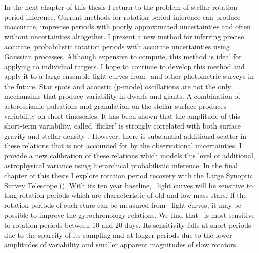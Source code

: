 In the next chapter of this thesis I return to the problem of stellar rotation
period inference.
Current methods for rotation period inference can produce inaccurate,
imprecise periods with poorly approximated uncertainties and often without
uncertainties altogether.
I present a new method for inferring precise, accurate, probabilistic rotation
periods with accurate uncertainties using Gaussian processes.
Although expensive to compute, this method is ideal for applying to individual
targets.
I hope to continue to develop this method and apply it to a large ensemble
light curves from \kepler\ and other photometric surveys in the future.
Star spots and acoustic (p-mode) oscillations are not the only mechansims
that produce variability in dwarfs and giants.
A combination of asteroseismic pulsations and granulation on the stellar
surface produces variability on short timescales.
It has been shown that the amplitude of this short-term variability, called
`flicker' is strongly correlated with both surface gravity and stellar
density \citep{Bastien2013, Bastien2016, Kipping2014}.
However, there is substantial additional scatter in these relations that is
not accounted for by the observational uncertainties.
I provide a new calibration of these relations which models this level of
additional, astrophysical variance using hierarchical probabilistic inference.
In the final chapter of this thesis I explore rotation period recovery with
the Large Synoptic Survey Telescope (\LSST).
With its ten year baseline, \LSST\ light curves will be sensitive to long
rotation periods which are characteristic of old and low-mass stars.
If the rotation periods of such stars can be measured from \LSST\ light
curves, it may be possible to improve the gyrochronology relations.
We find that \LSST\ is most sensitive to rotation periods between 10 and 20
days.
Its sensitivity falls at short periods due to the sparcity of its sampling and
at longer periods due to the lower amplitudes of variability and smaller
apparent magnitudes of slow rotators.
